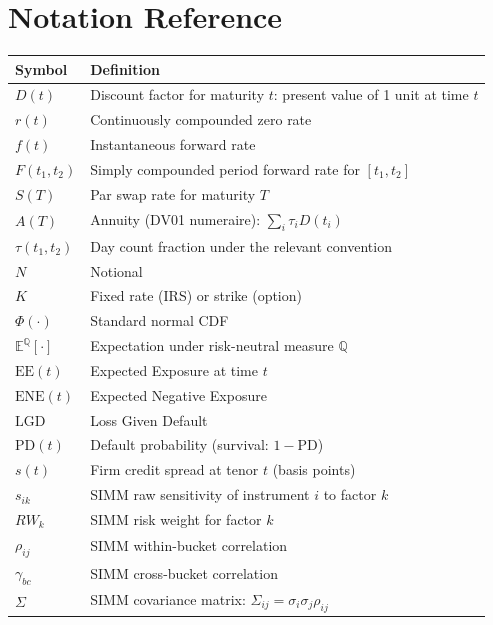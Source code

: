 \documentclass[11pt, a4paper]{article}
\begin{document}
\appendix
\section{Notation Reference}

\begin{center}
\begin{tabular}{L{2.5cm} L{10cm}}
\toprule
\textbf{Symbol} & \textbf{Definition} \\
\midrule
$D(t)$          & Discount factor for maturity $t$: present value of 1 unit at time $t$ \\
$r(t)$          & Continuously compounded zero rate \\
$f(t)$          & Instantaneous forward rate \\
$F(t_1,t_2)$    & Simply compounded period forward rate for $[t_1,t_2]$ \\
$S(T)$          & Par swap rate for maturity $T$ \\
$A(T)$          & Annuity (DV01 numeraire): $\sum_i \tau_i D(t_i)$ \\
$\tau(t_1,t_2)$ & Day count fraction under the relevant convention \\
$N$             & Notional \\
$K$             & Fixed rate (IRS) or strike (option) \\
$\Phi(\cdot)$   & Standard normal CDF \\
$\mathbb{E}^{\mathbb{Q}}[\cdot]$  & Expectation under risk-neutral measure $\mathbb{Q}$ \\
$\mathrm{EE}(t)$& Expected Exposure at time $t$ \\
$\mathrm{ENE}(t)$ & Expected Negative Exposure \\
$\mathrm{LGD}$  & Loss Given Default \\
$\mathrm{PD}(t)$ & Default probability (survival: $1-\mathrm{PD}$) \\
$s(t)$          & Firm credit spread at tenor $t$ (basis points) \\
$s_{ik}$        & SIMM raw sensitivity of instrument $i$ to factor $k$ \\
$RW_k$          & SIMM risk weight for factor $k$ \\
$\rho_{ij}$     & SIMM within-bucket correlation \\
$\gamma_{bc}$   & SIMM cross-bucket correlation \\
$\Sigma$        & SIMM covariance matrix: $\Sigma_{ij} = \sigma_i\sigma_j\rho_{ij}$ \\
\bottomrule
\end{tabular}
\end{center}
\end{document}
